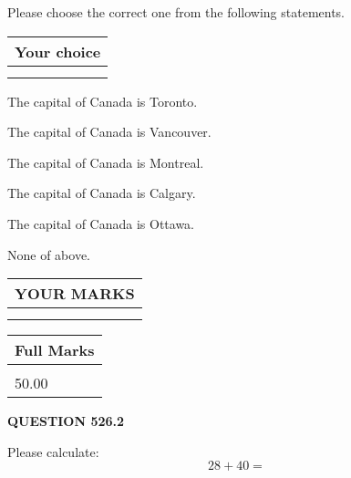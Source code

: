 \documentclass[12pt]{article}
\begin{document}
  
Please choose the correct one from the following statements.
  
  
\noindent\hspace{3.0in} \begin{tabular}{|l|}
\hline
Your choice \\
\hline
 \\ 
 \\ 
\hline
\end{tabular}
  
  
 
 
The capital of Canada is Toronto.
 
 
The capital of Canada is Vancouver.
 
 
The capital of Canada is Montreal.
 
 
The capital of Canada is Calgary.
 
 
The capital of Canada is Ottawa.
 
 
 None of above.
 
 
  
\vspace{0.2in}
  
\noindent\begin{tabular}{|l|}
\hline
 YOUR MARKS  \\
\hline
 \\ 
 \\ 
\hline
\end{tabular}
\hspace{0.05in} \begin{tabular}{|l|}
\hline
 Full Marks  \\
\hline
 \\ 
50.00 \\
\hline
\end{tabular}
{\textbf{\Large{QUESTION
526.2 
}}}
  
  
 
Please calculate:
\begin{equation}
28 +  %
40 = \nonumber
\end{equation}
 

 

 
   
   
 \vspace{0.2in}
 
   
   
   
   
\end{document}

